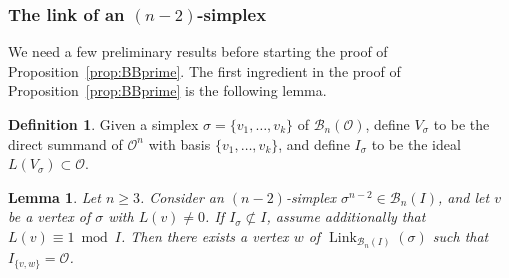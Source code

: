 \documentclass[11 pt]{article}
\theoremstyle{plain}
\newtheorem{lemma}[theorem]{Lemma}
\theoremstyle{definition}
\newtheorem{definition}[theorem]{Definition}
\numberwithin{equation}{section}
\renewcommand{\O}{\mathcal{O}}
\newcommand\PartialBases{\ensuremath{\mathcal{B}}}
\DeclareMathOperator{\Link}{Link}
\begin{document}
\subsubsection{The link of an \texorpdfstring{$(n-2)$-simplex}{(n-2)-simplex}}
We need a few preliminary results before starting the proof of 
Proposition~\ref{prop:BBprime}. The first ingredient in the proof of Proposition~\ref{prop:BBprime} is the following lemma.
\begin{definition}
Given a simplex $\sigma = \{v_1,\ldots,v_k\}$ of $\PartialBases_n(\O)$, define $V_{\sigma}$ to be the direct summand of $\O^n$ with basis $\{v_1,\ldots,v_k\}$, and define $I_{\sigma}$ to be the ideal $L(V_{\sigma}) \subset \O$.
\end{definition}
\begin{lemma}
\label{lemma:complement2}
Let $n \geq 3$. Consider an $(n-2)$-simplex $\sigma^{n-2}\in\PartialBases_n(I)$, and let $v$ be a vertex of $\sigma$ with $L(v)\neq 0$.  If $I_\sigma \not\subset I$,
 assume additionally that $L(v) \equiv 1\bmod{I}$. Then there exists a vertex $w$ of $\Link_{\PartialBases_n(I)}(\sigma)$ such that
$I_{\{v,w\}} = \O$.
\end{lemma}
\end{document}
